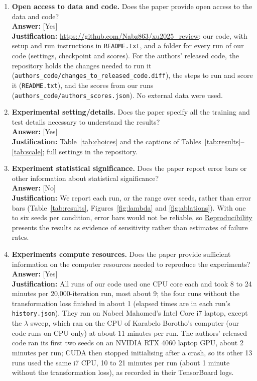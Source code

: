 \documentclass[10pt,letterpaper]{article}
\begin{document}
\begin{enumerate}
\item \textbf{Open access to data and code.} Does the paper provide open access to the data and code?\\
\textbf{Answer:} [Yes]\\
\textbf{Justification:} \url{https://github.com/Nabz863/xu2025_review}: our code, with setup and run instructions in \texttt{README.txt}, and a folder for every run of our code (settings, checkpoint and scores). For the authors' released code, the repository holds the changes needed to run it (\texttt{authors\_code/changes\_to\_released\_code.diff}), the steps to run and score it (\texttt{README.txt}), and the scores from our runs (\texttt{authors\_code/authors\_scores.json}). No external data were used.
 
\item \textbf{Experimental setting/details.} Does the paper specify all the training and test details necessary to understand the results?\\
\textbf{Answer:} [Yes]\\
\textbf{Justification:} Table~\ref{tab:choices} and the captions of Tables~\ref{tab:results}--\ref{tab:scale}; full settings in the repository.
 
\item \textbf{Experiment statistical significance.} Does the paper report error bars or other information about statistical significance?\\
\textbf{Answer:} [No]\\
\textbf{Justification:} We report each run, or the range over seeds, rather than error bars (Table~\ref{tab:results}, Figures~\ref{fig:lambda} and \ref{fig:ablations}). With one to six seeds per condition, error bars would not be reliable, so \hyperref[sec:repro]{Reproducibility} presents the results as evidence of sensitivity rather than estimates of failure rates.
 
\item \textbf{Experiments compute resources.} Does the paper provide sufficient information on the computer resources needed to reproduce the experiments?\\
\textbf{Answer:} [Yes]\\
\textbf{Justification:} All runs of our code used one CPU core each and took 8 to 24 minutes per 20{,}000-iteration run, most about 9; the four runs without the transformation loss finished in about 1 (elapsed times are in each run's \texttt{history.json}). They ran on Nabeel Mahomed's Intel Core i7 laptop, except the $\lambda$ sweep, which ran on the CPU of Karabelo Borotho's computer (our code runs on CPU only) at about 11 minutes per run. The authors' released code ran its first two seeds on an NVIDIA RTX 4060 laptop GPU, about 2 minutes per run; CUDA then stopped initialising after a crash, so its other 13 runs used the same i7 CPU, 10 to 21 minutes per run (about 1 minute without the transformation loss), as recorded in their TensorBoard logs.
 

\end{enumerate}
\end{document}
